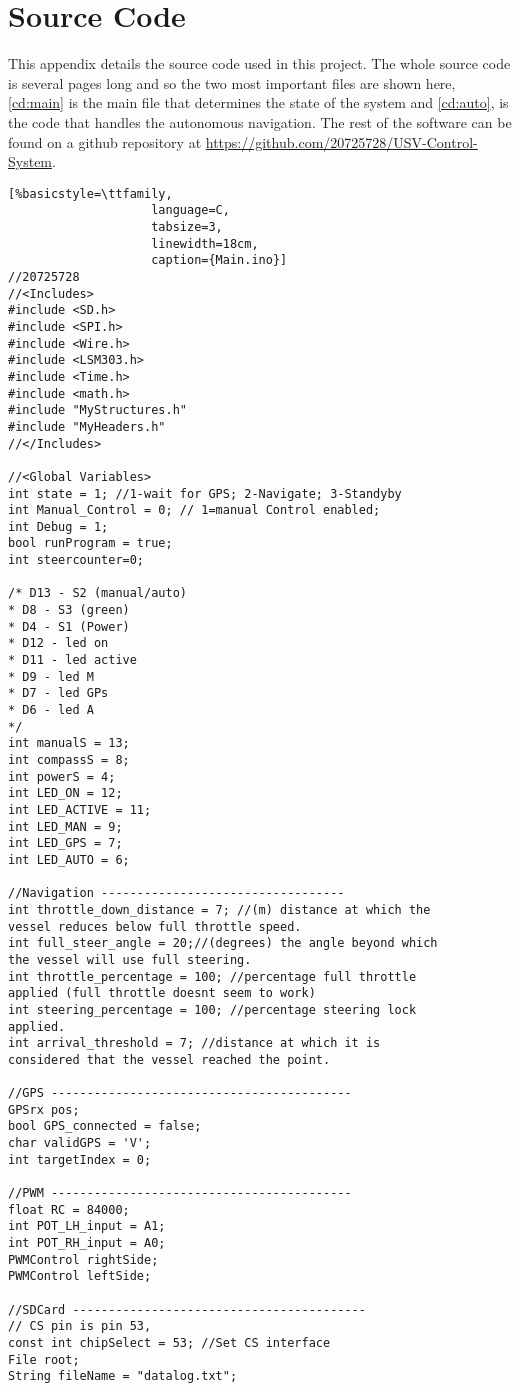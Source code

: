 \chapter{Source Code}
This appendix details the source code used in this project. The whole source code is several pages long and so the two most important files are shown here, \ref{cd:main} is the main file that determines the state of the system and \ref{cd:auto}, is the code that handles the autonomous navigation. The rest of the software can be found on a github repository at \url{https://github.com/20725728/USV-Control-System}.
\begin{lstlisting}[%basicstyle=\ttfamily,
					language=C,
					tabsize=3,
					linewidth=18cm,
					caption={Main.ino}]
//20725728
//<Includes>
#include <SD.h>
#include <SPI.h>
#include <Wire.h>
#include <LSM303.h>
#include <Time.h>
#include <math.h>
#include "MyStructures.h"
#include "MyHeaders.h"
//</Includes>

//<Global Variables>
int state = 1; //1-wait for GPS; 2-Navigate; 3-Standyby
int Manual_Control = 0; // 1=manual Control enabled;
int Debug = 1;
bool runProgram = true;
int steercounter=0;

/* D13 - S2 (manual/auto)
* D8 - S3 (green)
* D4 - S1 (Power)
* D12 - led on
* D11 - led active 
* D9 - led M
* D7 - led GPs
* D6 - led A
*/
int manualS = 13;
int compassS = 8;
int powerS = 4;
int LED_ON = 12;
int LED_ACTIVE = 11;
int LED_MAN = 9;
int LED_GPS = 7;
int LED_AUTO = 6;

//Navigation ----------------------------------
int throttle_down_distance = 7; //(m) distance at which the
vessel reduces below full throttle speed.
int full_steer_angle = 20;//(degrees) the angle beyond which
the vessel will use full steering.
int throttle_percentage = 100; //percentage full throttle
applied (full throttle doesnt seem to work)
int steering_percentage = 100; //percentage steering lock
applied.
int arrival_threshold = 7; //distance at which it is
considered that the vessel reached the point.

//GPS ------------------------------------------
GPSrx pos;
bool GPS_connected = false;
char validGPS = 'V';
int targetIndex = 0;

//PWM ------------------------------------------
float RC = 84000;
int POT_LH_input = A1;
int POT_RH_input = A0;
PWMControl rightSide;
PWMControl leftSide;

//SDCard -----------------------------------------
// CS pin is pin 53,
const int chipSelect = 53; //Set CS interface
File root;
String fileName = "datalog.txt";


\end{lstlisting}
